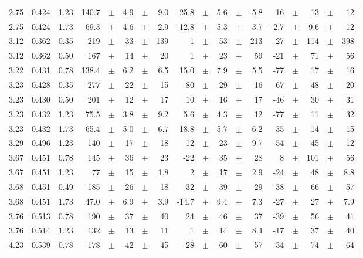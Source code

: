\documentclass[prc,floatfix,twocolumn,superscriptaddress,letter]{revtex4}
\begin{document}
\begin{longtable}{ccc@{\extracolsep{1cm}}d@{\extracolsep{0pt}}cdcd@{\extracolsep{1cm}}d@{\extracolsep{0pt}}cdcd@{\extracolsep{1cm}}d@{\extracolsep{0pt}}cdcd}
2.75 & 0.424 & 1.23 	&	 140.7	 &  $\pm$	& 4.9 &	 $\pm$	& 9.0 &	 -25.8 &	$\pm$& 	 5.6 &	$\pm$& 	 5.8 & -16 & $\pm$ & 13 & 	$\pm$ & 12\\
2.75 & 0.424 & 1.73 	&	 69.3	 &  $\pm$	& 4.6 &	 $\pm$	& 2.9 &	 -12.8 &	$\pm$& 	 5.3 &	$\pm$& 	 3.7 & -2.7 & $\pm$ & 9.6 & 	$\pm$ & 12\\
3.12 & 0.362 & 0.35 	&	 219	 &  $\pm$	& 33 &	 $\pm$	& 139 &	 1 &	$\pm$& 	 53 &	$\pm$& 	 213 & 27 & $\pm$ & 114 & 	$\pm$ & 398\\
3.12 & 0.362 & 0.50 	&	 167	 &  $\pm$	& 14 &	 $\pm$	& 20 &	 1 &	$\pm$& 	 23 &	$\pm$& 	 59 & -21 & $\pm$ & 71 & 	$\pm$ & 56\\
3.22 & 0.431 & 0.78 	&	 138.4	 &  $\pm$	& 6.2 &	 $\pm$	& 6.5 &	 15.0 &	$\pm$& 	 7.9 &	$\pm$& 	 5.5 & -77 & $\pm$ & 17 & 	$\pm$ & 16\\
3.23 & 0.428 & 0.35 	&	 277	 &  $\pm$	& 22 &	 $\pm$	& 15 &	 -80 &	$\pm$& 	 29 &	$\pm$& 	 16 & 67 & $\pm$ & 48 & 	$\pm$ & 20\\
3.23 & 0.430 & 0.50 	&	 201	 &  $\pm$	& 12 &	 $\pm$	& 17 &	 10 &	$\pm$& 	 16 &	$\pm$& 	 17 & -46 & $\pm$ & 30 & 	$\pm$ & 31\\
3.23 & 0.432 & 1.23 	&	 75.5	 &  $\pm$	& 3.8 &	 $\pm$	& 9.2 &	 5.6 &	$\pm$& 	 4.3 &	$\pm$& 	 12 & -77 & $\pm$ & 11 & 	$\pm$ & 32\\
3.23 & 0.432 & 1.73 	&	 65.4	 &  $\pm$	& 5.0 &	 $\pm$	& 6.7 &	 18.8 &	$\pm$& 	 5.7 &	$\pm$& 	 6.2 & 35 & $\pm$ & 14 & 	$\pm$ & 15\\
3.29 & 0.496 & 1.23 	&	 140	 &  $\pm$	& 17 &	 $\pm$	& 18 &	 -12 &	$\pm$& 	 23 &	$\pm$& 	 9.7 & -54 & $\pm$ & 45 & 	$\pm$ & 12\\
3.67 & 0.451 & 0.78 	&	 145	 &  $\pm$	& 36 &	 $\pm$	& 23 &	 -22 &	$\pm$& 	 35 &	$\pm$& 	 28 & 8 & $\pm$ & 101 & 	$\pm$ & 56\\
3.67 & 0.451 & 1.23 	&	 77	 &  $\pm$	& 15 &	 $\pm$	& 1.8 &	 2 &	$\pm$& 	 17 &	$\pm$& 	 2.9 & -24 & $\pm$ & 48 & 	$\pm$ & 8.8\\
3.68 & 0.451 & 0.49 	&	 185	 &  $\pm$	& 26 &	 $\pm$	& 18 &	 -32 &	$\pm$& 	 39 &	$\pm$& 	 29 & -38 & $\pm$ & 66 & 	$\pm$ & 57\\
3.68 & 0.451 & 1.73 	&	 47.0	 &  $\pm$	& 6.9 &	 $\pm$	& 3.9 &	 -14.7 &	$\pm$& 	 9.4 &	$\pm$& 	 7.3 & -27 & $\pm$ & 27 & 	$\pm$ & 7.9\\
3.76 & 0.513 & 0.78 	&	 190	 &  $\pm$	& 37 &	 $\pm$	& 40 &	 24 &	$\pm$& 	 46 &	$\pm$& 	 37 & -39 & $\pm$ & 56 & 	$\pm$ & 41\\
3.76 & 0.514 & 1.23 	&	 132	 &  $\pm$	& 13 &	 $\pm$	& 11 &	 1 &	$\pm$& 	 14 &	$\pm$& 	 8.4 & -17 & $\pm$ & 37 & 	$\pm$ & 40\\
4.23 & 0.539 & 0.78 	&	 178	 &  $\pm$	& 42 &	 $\pm$	& 45 &	 -28 &	$\pm$& 	 60 &	$\pm$& 	 57 & -34 & $\pm$ & 74 & 	$\pm$ & 64\\
\end{longtable}
\end{document}
